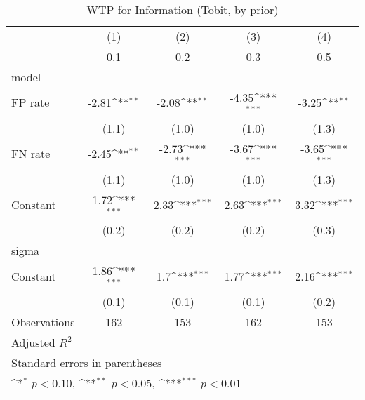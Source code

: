 \begin{table}[htbp]\centering
\def\sym#1{\ifmmode^{#1}\else\(^{#1}\)\fi}
\caption{WTP for Information (Tobit, by prior)}
\begin{tabular}{l*{4}{c}}
\hline\hline
                &\multicolumn{1}{c}{(1)}&\multicolumn{1}{c}{(2)}&\multicolumn{1}{c}{(3)}&\multicolumn{1}{c}{(4)}\\
                &\multicolumn{1}{c}{0.1}&\multicolumn{1}{c}{0.2}&\multicolumn{1}{c}{0.3}&\multicolumn{1}{c}{0.5}\\
\hline
model           &                  &                  &                  &                  \\
FP rate         &    -2.81\sym{**} &    -2.08\sym{**} &    -4.35\sym{***}&    -3.25\sym{**} \\
                &    (1.1)         &    (1.0)         &    (1.0)         &    (1.3)         \\
FN rate         &    -2.45\sym{**} &    -2.73\sym{***}&    -3.67\sym{***}&    -3.65\sym{***}\\
                &    (1.1)         &    (1.0)         &    (1.0)         &    (1.3)         \\
Constant        &     1.72\sym{***}&     2.33\sym{***}&     2.63\sym{***}&     3.32\sym{***}\\
                &    (0.2)         &    (0.2)         &    (0.2)         &    (0.3)         \\
\hline
sigma           &                  &                  &                  &                  \\
Constant        &     1.86\sym{***}&      1.7\sym{***}&     1.77\sym{***}&     2.16\sym{***}\\
                &    (0.1)         &    (0.1)         &    (0.1)         &    (0.2)         \\
\hline
Observations    &      162         &      153         &      162         &      153         \\
Adjusted \(R^{2}\)&                  &                  &                  &                  \\
\hline\hline
\multicolumn{5}{l}{\footnotesize Standard errors in parentheses}\\
\multicolumn{5}{l}{\footnotesize \sym{*} \(p<0.10\), \sym{**} \(p<0.05\), \sym{***} \(p<0.01\)}\\
\end{tabular}
\end{table}
